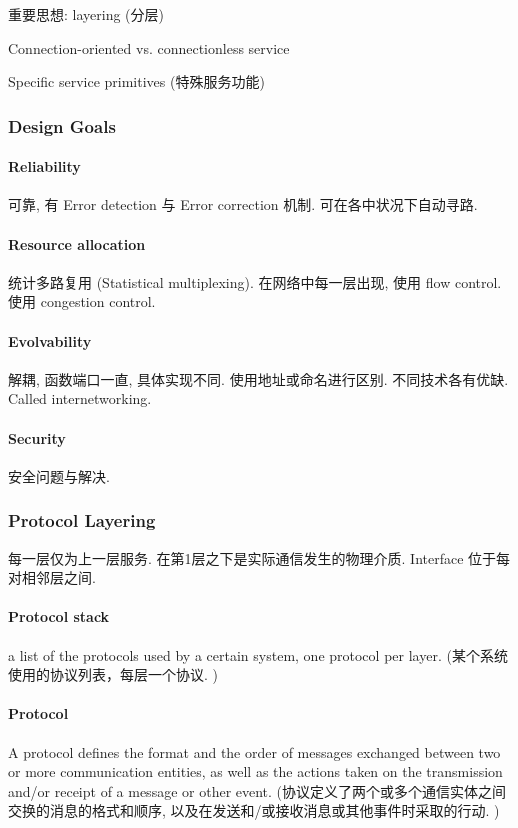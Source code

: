 重要思想: layering (分层)

Connection-oriented vs. connectionless service

Specific service primitives (特殊服务功能)

\subsubsection{Design Goals}
\paragraph{Reliability} 可靠, 有 Error detection 与 Error correction 机制. 可在各中状况下自动寻路.
\paragraph{Resource allocation} 统计多路复用 (Statistical multiplexing). 在网络中每一层出现, 使用 flow control. 使用 congestion control. 
\paragraph{Evolvability} 解耦, 函数端口一直, 具体实现不同. 使用地址或命名进行区别. 不同技术各有优缺. Called internetworking. 
\paragraph{Security} 安全问题与解决. 

\subsubsection{Protocol Layering} 
每一层仅为上一层服务. 在第1层之下是实际通信发生的物理介质. Interface 位于每对相邻层之间. 

\paragraph{Protocol stack} a list of the protocols used by a certain system, one protocol per layer. (某个系统使用的协议列表，每层一个协议. )
\paragraph{Protocol}A protocol defines the format and the order of messages exchanged between two or more communication entities, as well as the actions taken on the transmission and/or receipt of a message or other event. (协议定义了两个或多个通信实体之间交换的消息的格式和顺序, 以及在发送和/或接收消息或其他事件时采取的行动. )

